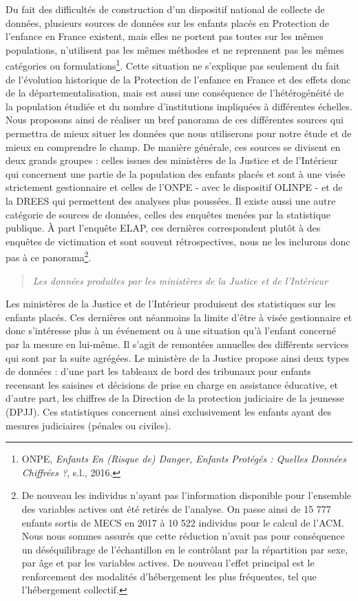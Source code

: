 \documentclass[
  12,
  a4paper,
]{report}
\begin{document}
Du fait des difficultés de construction d'un dispositif national de
collecte de données, plusieurs sources de données sur les enfants placés
en Protection de l'enfance en France existent, mais elles ne portent pas
toutes sur les mêmes populations, n'utilisent pas les mêmes méthodes et
ne reprennent pas les mêmes catégories ou formulations\footnote{ONPE,
  \emph{Enfants En (Risque de) Danger, Enfants Protégés : Quelles
  Données Chiffrées ?}, s.l., 2016.}. Cette situation ne s'explique pas
seulement du fait de l'évolution historique de la Protection de
l'enfance en France et des effets donc de la départementalisation, mais
est aussi une conséquence de l'hétérogénéité de la population étudiée et
du nombre d'institutions impliquées à différentes échelles. Nous
proposons ainsi de réaliser un bref panorama de ces différentes sources
qui permettra de mieux situer les données que nous utiliserons pour
notre étude et de mieux en comprendre le champ. De manière générale, ces
sources se divisent en deux grands groupes : celles issues des
ministères de la Justice et de l'Intérieur qui concernent une partie de
la population des enfants placés et sont à une visée strictement
gestionnaire et celles de l'ONPE - avec le dispositif OLINPE - et de la
DREES qui permettent des analyses plus poussées. Il existe aussi une
autre catégorie de sources de données, celles des enquêtes menées par la
statistique publique. À part l'enquête ELAP, ces dernières correspondent
plutôt à des enquêtes de victimation et sont souvent rétrospectives,
nous ne les inclurons donc pas à ce panorama\footnote{De nouveau les
  individus n'ayant pas l'information disponible pour l'ensemble des
  variables actives ont été retirés de l'analyse. On passe ainsi de 15
  777 enfants sortis de MECS en 2017 à 10 522 individus pour le calcul
  de l'ACM. Nous nous sommes assurés que cette réduction n'avait pas
  pour conséquence un déséquilibrage de l'échantillon en le contrôlant
  par la répartition par sexe, par âge et par les variables actives. De
  nouveau l'effet principal est le renforcement des modalités
  d'hébergement les plus fréquentes, tel que l'hébergement collectif.}.

\begin{quote}
\emph{Les données produites par les ministères de la Justice et de
l'Intérieur}
\end{quote}

Les ministères de la Justice et de l'Intérieur produisent des
statistiques sur les enfants placés. Ces dernières ont néanmoins la
limite d'être à visée gestionnaire et donc s'intéresse plus à un
événement ou à une situation qu'à l'enfant concerné par la mesure en
lui-même. Il s'agit de remontées annuelles des différents services qui
sont par la suite agrégées. Le ministère de la Justice propose ainsi
deux types de données : d'une part les tableaux de bord des tribunaux
pour enfants recensant les saisines et décisions de prise en charge en
assistance éducative, et d'autre part, les chiffres de la Direction de
la protection judiciaire de la jeunesse (DPJJ). Ces statistiques
concernent ainsi exclusivement les enfants ayant des mesures judiciaires
(pénales ou civiles).
\end{document}

